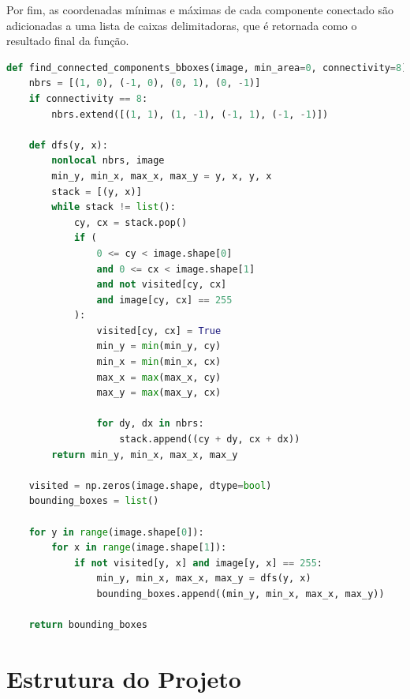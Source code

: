 \documentclass[english, 
               brazil, 
               bsc] %
               {dcomp-abntex2}
\begin{document}
Por fim, as coordenadas mínimas e máximas de cada componente conectado são adicionadas a uma lista de caixas delimitadoras, que é retornada como o resultado final da função.
\begin{codigo}[h]
  \caption{\small.}
 \label{fdilate2}
\begin{lstlisting}[language=python]
def find_connected_components_bboxes(image, min_area=0, connectivity=8):
    nbrs = [(1, 0), (-1, 0), (0, 1), (0, -1)]
    if connectivity == 8:
        nbrs.extend([(1, 1), (1, -1), (-1, 1), (-1, -1)])

    def dfs(y, x):
        nonlocal nbrs, image
        min_y, min_x, max_x, max_y = y, x, y, x
        stack = [(y, x)]
        while stack != list():
            cy, cx = stack.pop()
            if (
                0 <= cy < image.shape[0]
                and 0 <= cx < image.shape[1]
                and not visited[cy, cx]
                and image[cy, cx] == 255
            ):
                visited[cy, cx] = True
                min_y = min(min_y, cy)
                min_x = min(min_x, cx)
                max_x = max(max_x, cy)
                max_y = max(max_y, cx)

                for dy, dx in nbrs:
                    stack.append((cy + dy, cx + dx))
        return min_y, min_x, max_x, max_y

    visited = np.zeros(image.shape, dtype=bool)
    bounding_boxes = list()

    for y in range(image.shape[0]):
        for x in range(image.shape[1]):
            if not visited[y, x] and image[y, x] == 255:
                min_y, min_x, max_x, max_y = dfs(y, x)
                bounding_boxes.append((min_y, min_x, max_x, max_y))

    return bounding_boxes

\end{lstlisting}
\end{codigo}







\chapter{Estrutura do Projeto}
\end{document}
